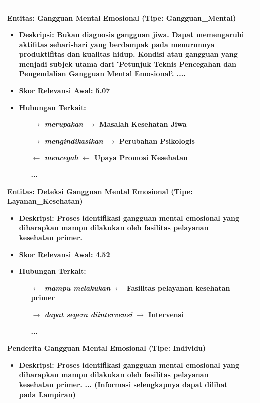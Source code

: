 \begin{longtable}{|p{}|p{}|}
	\textbf{Entitas: Gangguan Mental Emosional} (Tipe: Gangguan\_Mental)
	\begin{itemize}
		\item Deskripsi: Bukan diagnosis gangguan jiwa.
		      Dapat memengaruhi aktifitas sehari-hari yang berdampak pada menurunnya produktifitas dan kualitas hidup.
		      Kondisi atau gangguan yang menjadi subjek utama dari 'Petunjuk Teknis Pencegahan dan Pengendalian Gangguan Mental Emosional'.
		      ....
		\item Skor Relevansi Awal: 5.07
		\item Hubungan Terkait:
		      \begin{itemize}
			      \item[$\rightarrow$] \textsl{merupakan} $\rightarrow$ Masalah Kesehatan Jiwa
			      \item[$\rightarrow$] \textsl{mengindikasikan} $\rightarrow$ Perubahan Psikologis
			      \item[$\leftarrow$] \textsl{mencegah} $\leftarrow$ Upaya Promosi Kesehatan
			      \item [...]
		      \end{itemize}
	\end{itemize}
	\textbf{Entitas: Deteksi Gangguan Mental Emosional} (Tipe: Layanan\_Kesehatan)
	\begin{itemize}
		\item Deskripsi: Proses identifikasi gangguan mental emosional yang diharapkan mampu dilakukan oleh fasilitas pelayanan kesehatan primer.
		\item Skor Relevansi Awal: 4.52
		\item Hubungan Terkait:
		      \begin{itemize}
			      \item[$\leftarrow$] \textsl{mampu melakukan} $\leftarrow$ Fasilitas pelayanan kesehatan primer
			      \item[$\rightarrow$] \textsl{dapat segera diintervensi} $\rightarrow$ Intervensi
			      \item[...]
		      \end{itemize}
	\end{itemize}
	\textbf{Penderita Gangguan Mental Emosional} (Tipe: Individu)
	\begin{itemize}
		\item Deskripsi: Proses identifikasi gangguan mental emosional yang diharapkan mampu dilakukan oleh fasilitas pelayanan kesehatan primer.
		      ... (Informasi selengkapnya dapat dilihat pada Lampiran)
	\end{itemize}
	\\
	\hline


\end{longtable}
